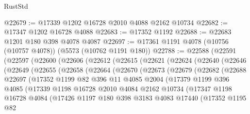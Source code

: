 \begin{lexlean}{RustStd}
\begin{coremodule}
@22679 := @17339 @1202 @16728 @2010 @4088 @2162 @10734
@22682 := @17347 @1202 @16728 @4088
@22683 := @17352 @1192
@22688 := @22683 @1201 @180 @398 @4078 @4087
@22697 := @17361 @1191 @4078 (@10756 (@10757 @4078)) (@5573 (@10762 @1191 @180))
@22788 := @22588
    (@22591
      (@22597
        (@22600
          (@22606
            (@22612
              (@22615
                (@22621
                  (@22624
                    (@22640
                      (@22646
                        (@22649
                          (@22655
                            (@22658
                              (@22664
                                (@22670
                                  (@22673
                                    (@22679
                                      (@22682
                                        (@22688
                                          @22697
                                          (@17352
                                            @1199
                                            @82
                                            @396
                                            @11
                                            @4085
                                            @2004
                                            (@17379
                                              @1199
                                              @396
                                              @4085
                                              (@17339
                                                @1198
                                                @16728
                                                @2010
                                                @4084
                                                @2162
                                                @10734
                                                (@17347
                                                  @1198
                                                  @16728
                                                  @4084
                                                  (@17426
                                                    @1197
                                                    @180
                                                    @398
                                                    @3183
                                                    @4083
                                                    @17440
                                                    (@17352
                                                      @1195
                                                      @82

\end{coremodule}
\end{lexlean}
